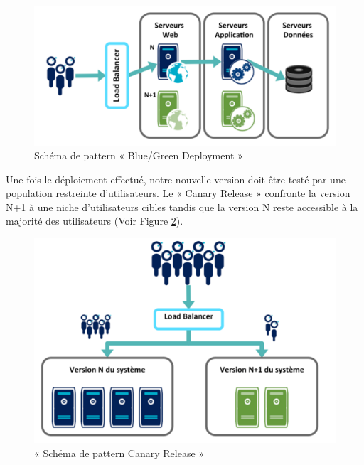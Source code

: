         \begin{figure}
          \begin{center}
            \includegraphics[scale=0.7]{images/BlueGreenDeployment.png}
          \end{center}
          \caption{Schéma de pattern « Blue/Green Deployment »}
          \label{BlueGreen}
        \end{figure}

        Une fois le déploiement effectué, notre nouvelle version doit être testé par une population restreinte d’utilisateurs. Le « Canary Release » confronte la version N+1 à une niche d’utilisateurs cibles tandis que la version N reste accessible à la majorité des utilisateurs (Voir Figure \ref{CanaryRelease}).\\

        \begin{figure}
          \begin{center}
            \includegraphics[scale=0.6]{images/CanaryRelease.png}
          \end{center}
          \caption{« Schéma de pattern Canary Release »}
          \label{CanaryRelease}
        \end{figure}

